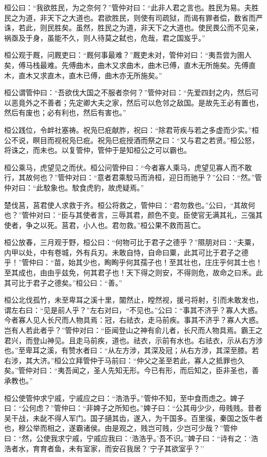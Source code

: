 \documentclass[]{article}
\begin{document}
桓公曰：``我欲胜民，为之奈何？''管仲对曰：``此非人君之言也。胜民为易。夫胜民之为道，非天下之大道也。君欲胜民，则使有司疏狱，而谒有罪者偿，数省而严诛，若此，则民胜矣。虽然，胜民之为道，非天下之大道也。使民畏公而不见亲，祸亟及于身，虽能不久，则人待莫之弑也，危哉，君之国岌乎。''

桓公观于厩，问厩吏曰：``厩何事最难？''厩吏未对，管仲对曰：``夷吾尝为圉人矣，傅马栈最难。先傅曲木，曲木又求曲木，曲木已傅，直木无所施矣。先傅直木，直木又求直木，直木已傅，曲木亦无所施矣。''

桓公谓管仲曰：``吾欲伐大国之不服者奈何？''管仲对曰：``先爱四封之内，然后可以恶竟外之不善者；先定卿大夫之家，然后可以危邻之敌国。是故先王必有置也，然后有废也；必有利也，然后有害也。''

桓公践位，令衅社塞祷。祝凫巳疪献胙，祝曰：``除君苛疾与若之多虚而少实。''桓公不说，瞑目而视祝凫巳疪。祝凫巳疪授酒而祭之曰：``又与君之若贤。''桓公怒，将诛之，而未也。以复管仲，管仲于是知桓公之可以霸也。

桓公乘马，虎望见之而伏。桓公问管仲曰：``今者寡人乘马，虎望见寡人而不敢行，其故何也？''管仲对曰：``意者君乘駮马而洀桓，迎日而驰乎？''公曰：``然。''管仲对曰：``此駮象也。駮食虎豹，故虎疑焉。''

楚伐莒，莒君使人求救于齐。桓公将救之，管仲曰：``君勿救也。''公曰，``其故何也？''管仲对曰：``臣与其使者言，三辱其君，颜色不变。臣使官无满其礼，三强其使者，争之以死。莒君，小人也。君勿救。''桓公果不救而莒亡。

桓公放春，三月观于野，桓公曰：``何物可比于君子之德乎？''隰朋对曰：``夫粟，内甲以处，中有卷城，外有兵刃。未敢自恃，自命曰粟，此其可比于君子之德乎！''管仲曰：``苗，始其少也，眴眴乎何其孺子也！至其壮也，庄庄乎何其士也！至其成也，由由乎兹免，何其君子也！天下得之则安，不得则危，故命之曰禾。此其可比于君子之德矣。''桓公曰：``善。''

桓公北伐孤竹，未至卑耳之溪十里，闟然止，瞠然视，援弓将射，引而未敢发也，谓左右曰：``见是前人乎？''左右对曰，``不见也。''公曰：``事其不济乎？寡人大惑。今者寡人见人长尺而人物具焉：冠，右祛衣，走马前疾。事其不济乎？寡人大惑。岂有人若此者乎？''管仲对曰：``臣闻登山之神有俞儿者，长尺而人物具焉。霸王之君兴，而登山神见。且走马前疾，道也。祛衣，示前有水也。右祛衣，示从右方涉也。''至卑耳之溪，有赞水者曰：``从左方涉，其深及冠；从右方涉，其深至膝。若右涉，其大济。''桓公立拜管仲于马前曰：``仲父之圣至若此，寡人之抵罪也久矣。''管仲对曰：``夷吾闻之，圣人先知无形。今已有形，而后知之，臣非圣也，善承教也。''

桓公使管仲求宁戚，宁戚应之曰：``浩浩乎。''管仲不知，至中食而虑之。婢子曰：``公何虑？''管仲曰：``非婢子之所知也。''婢子曰：``公其毋少少，毋贱贱。昔者吴干战，未龀不得人军门。国子擿其齿，遂入，为干国多。百里徯，秦国之饭牛者也，穆公举而相之，遂霸诸侯。由是观之，贱岂可贱，少岂可少哉？''管仲曰：``然，公使我求宁戚，宁戚应我曰：`浩浩乎。'吾不识。''婢子曰：``诗有之：`浩浩者水，育育者鱼，未有室家，而安召我居？'宁子其欲室乎？''
\end{document}
